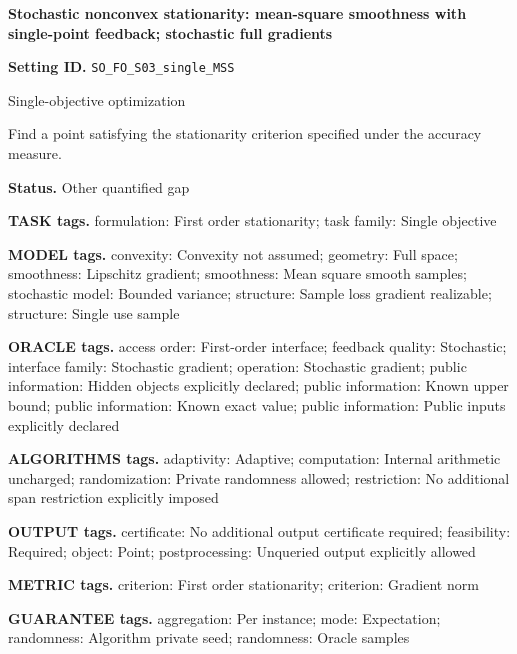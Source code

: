 \documentclass[10pt,a4paper]{article}
\begin{document}
\raggedright

{\LARGE\bfseries\sffamily\color{AtlasNavy} Stochastic nonconvex stationarity: mean-square smoothness with single-point feedback; stochastic full gradients\par}\vspace{5pt}


\textbf{Setting ID.} \texttt{SO\_\allowbreak{}FO\_\allowbreak{}S03\_\allowbreak{}single\_\allowbreak{}MSS}



Single-objective optimization



Find a point satisfying the stationarity criterion specified under the accuracy measure.



\textbf{Status.} Other quantified gap



\textbf{TASK tags.} formulation: First order stationarity; task family: Single objective



\textbf{MODEL tags.} convexity: Convexity not assumed; geometry: Full space; smoothness: Lipschitz gradient; smoothness: Mean square smooth samples; stochastic model: Bounded variance; structure: Sample loss gradient realizable; structure: Single use sample



\textbf{ORACLE tags.} access order: First-order interface; feedback quality: Stochastic; interface family: Stochastic gradient; operation: Stochastic gradient; public information: Hidden objects explicitly declared; public information: Known upper bound; public information: Known exact value; public information: Public inputs explicitly declared



\textbf{ALGORITHMS tags.} adaptivity: Adaptive; computation: Internal arithmetic uncharged; randomization: Private randomness allowed; restriction: No additional span restriction explicitly imposed



\textbf{OUTPUT tags.} certificate: No additional output certificate required; feasibility: Required; object: Point; postprocessing: Unqueried output explicitly allowed



\textbf{METRIC tags.} criterion: First order stationarity; criterion: Gradient norm



\textbf{GUARANTEE tags.} aggregation: Per instance; mode: Expectation; randomness: Algorithm private seed; randomness: Oracle samples
\end{document}
